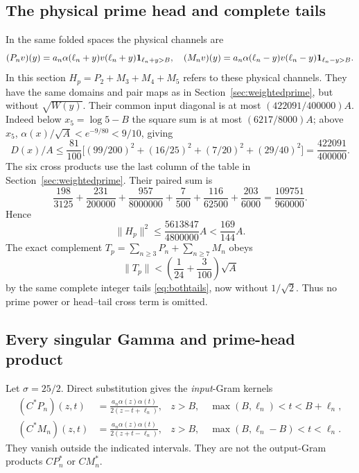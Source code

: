 \documentclass[11pt,a4paper]{article}
\numberwithin{equation}{section}
\theoremstyle{remark}\newtheorem{remark}[theorem]{Remark}
\newcommand{\norm}[1]{\lVert#1\rVert}\newcommand{\abs}[1]{\lvert#1\rvert}
\begin{document}
\subsection{The physical prime head and complete tails}
In the same folded spaces the physical channels are
\[
 (P_nv)(y)=a_n\alpha(\ell_n+y)v(\ell_n+y)\mathbf1_{\ell_n+y>B},\quad
 (M_nv)(y)=a_n\alpha(\ell_n-y)v(\ell_n-y)\mathbf1_{\ell_n-y>B}.
\]
In this section $H_p=P_2+M_3+M_4+M_5$ refers to these physical channels.
They have the same domains and pair maps as in Section~\ref{sec:weightedprime}, but without $\sqrt{W(y)}$.
Their common input diagonal is at most $(422091/400000)A$.
Indeed below $x_5=\log5-B$ the square sum is at most $(6217/8000)A$;
above $x_5$, $\alpha(x)/\sqrt A<e^{-9/80}<9/10$, giving
\[
 D(x)/A\le\frac{81}{100}\bigl[(99/200)^2+(16/25)^2
 +(7/20)^2+(29/40)^2\bigr]=\frac{422091}{400000}.
\]
The six cross products use the last column of the table in Section~\ref{sec:weightedprime}.
Their paired sum is
\[
 \frac{198}{3125}+\frac{231}{200000}+\frac{957}{8000000}
 +\frac7{500}+\frac{116}{62500}+\frac{203}{6000}
 =\frac{109751}{960000}.
\]
Hence
\begin{equation}\label{eq:physicalhead}
 \norm{H_p}^2\le\frac{5613847}{4800000}A<\frac{169}{144}A.
\end{equation}
The exact complement $T_p=\sum_{n\ge3}P_n+\sum_{n\ge7}M_n$ obeys
\begin{equation}\label{eq:physicaltail}
 \norm{T_p}<\left(\frac1{24}+\frac3{100}\right)\sqrt A
\end{equation}
by the same complete integer tails \eqref{eq:bothtails}, now without $1/\sqrt2$.
Thus no prime power or head--tail cross term is omitted.

\subsection{Every singular Gamma and prime-head product}
Let $\sigma=25/2$. Direct substitution gives the \emph{input}-Gram kernels
\begin{align}
 (C^*P_n)(z,t)&=\frac{a_n\alpha(z)\alpha(t)}
                      {2(z-t+\ell_n)},&
 z>B,\quad\max(B,\ell_n)<t<B+\ell_n,\label{eq:inputgramplus}\\
 (C^*M_n)(z,t)&=\frac{a_n\alpha(z)\alpha(t)}
                      {2(z+t-\ell_n)},&
 z>B,\quad\max(B,\ell_n-B)<t<\ell_n.\label{eq:inputgramminus}
\end{align}
They vanish outside the indicated intervals. They are not the output-Gram products $CP_n^*$ or $CM_n^*$.
\end{document}
